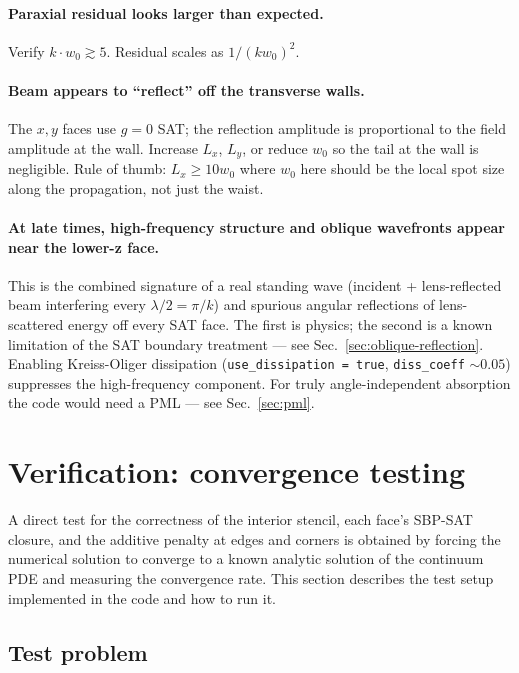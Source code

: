 \documentclass[11pt]{article}
\begin{document}
\paragraph{Paraxial residual looks larger than expected.} Verify
$k \cdot w_0 \gtrsim 5$. Residual scales as $1/(k w_0)^2$.

\paragraph{Beam appears to ``reflect'' off the transverse walls.}
The $x, y$ faces use $g = 0$ SAT; the reflection amplitude is
proportional to the field amplitude at the wall. Increase $L_x$,
$L_y$, or reduce $w_0$ so the tail at the wall is negligible. Rule
of thumb: $L_x \geq 10 w_0$ where $w_0$ here should be the local spot
size along the propagation, not just the waist.

\paragraph{At late times, high-frequency structure and oblique
wavefronts appear near the lower-z face.} This is the combined
signature of a real standing wave (incident + lens-reflected
beam interfering every $\lambda/2 = \pi/k$) and spurious
angular reflections of lens-scattered energy off every SAT face.
The first is physics; the second is a known limitation of the SAT
boundary treatment — see Sec.~\ref{sec:oblique-reflection}. Enabling
Kreiss-Oliger dissipation (\texttt{use\_dissipation = true},
\texttt{diss\_coeff} $\sim 0.05$) suppresses the high-frequency
component. For truly angle-independent absorption the code would
need a PML — see Sec.~\ref{sec:pml}.

\section{Verification: convergence testing}
\label{sec:convergence}

A direct test for the correctness of the interior stencil, each
face's SBP-SAT closure, and the additive penalty at edges and corners
is obtained by forcing the numerical solution to converge to a known
analytic solution of the continuum PDE and measuring the convergence
rate. This section describes the test setup implemented in the code
and how to run it.

\subsection{Test problem}
\end{document}
